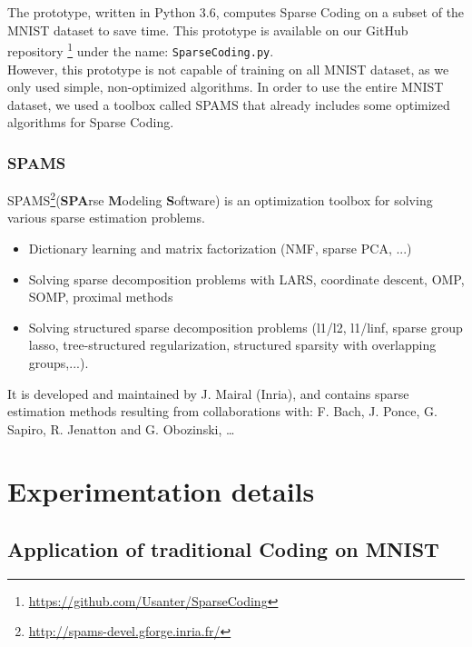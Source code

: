 The prototype, written in Python 3.6, computes Sparse Coding on a subset of the MNIST dataset to save time. This prototype is available on our GitHub repository \footnote{\url{https://github.com/Usanter/SparseCoding}} under the name: \texttt{SparseCoding.py}. \\
However, this prototype is not capable of training on all MNIST dataset, as we only used simple, non-optimized algorithms. In order to use the entire MNIST dataset, we used a toolbox called SPAMS that already includes some optimized algorithms for Sparse Coding.\\
\subsubsection{SPAMS}
SPAMS\footnote{\url{http://spams-devel.gforge.inria.fr/}}(\textbf{SPA}rse \textbf{M}odeling \textbf{S}oftware) is an optimization toolbox for solving various sparse estimation problems.
\begin{itemize}
 \item Dictionary learning and matrix factorization (NMF, sparse PCA, ...)
 \item Solving sparse decomposition problems with LARS, coordinate descent, OMP, SOMP, proximal methods
 \item Solving structured sparse decomposition problems (l1/l2, l1/linf, sparse group lasso, tree-structured regularization, structured sparsity with overlapping groups,...).
\end{itemize}
It is developed and maintained by J. Mairal (Inria), and contains sparse estimation methods resulting from collaborations with: F. Bach, J. Ponce, G. Sapiro, R. Jenatton and G. Obozinski, \dots\\
\newpage
\section{Experimentation details}
\subsection{Application of traditional Coding on MNIST}

